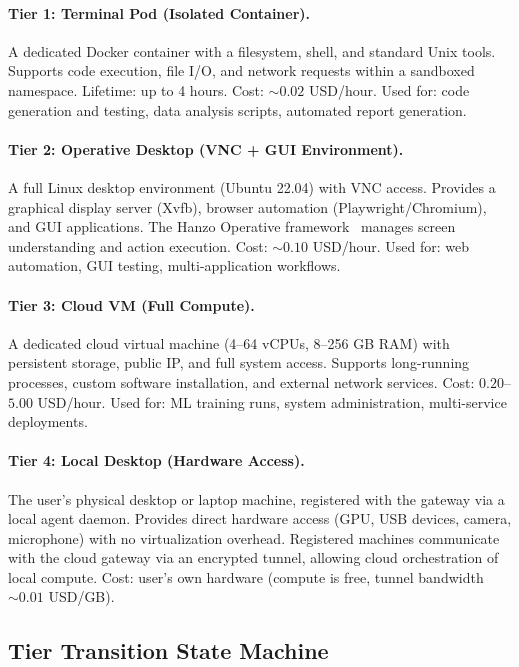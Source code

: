 \documentclass[11pt]{article}
\begin{document}
\paragraph{Tier 1: Terminal Pod (Isolated Container).}
A dedicated Docker container with a filesystem, shell, and standard
Unix tools. Supports code execution, file I/O, and network requests within
a sandboxed namespace. Lifetime: up to 4 hours. Cost: $\sim 0.02$ USD/hour.
Used for: code generation and testing, data analysis scripts, automated
report generation.

\paragraph{Tier 2: Operative Desktop (VNC + GUI Environment).}
A full Linux desktop environment (Ubuntu 22.04) with VNC access. Provides
a graphical display server (Xvfb), browser automation (Playwright/Chromium),
and GUI applications. The Hanzo Operative framework~\cite{hanzo2024operative}
manages screen understanding and action execution. Cost: $\sim 0.10$ USD/hour.
Used for: web automation, GUI testing, multi-application workflows.

\paragraph{Tier 3: Cloud VM (Full Compute).}
A dedicated cloud virtual machine (4--64 vCPUs, 8--256 GB RAM) with
persistent storage, public IP, and full system access. Supports long-running
processes, custom software installation, and external network services. Cost:
$0.20$--$5.00$ USD/hour. Used for: ML training runs, system administration,
multi-service deployments.

\paragraph{Tier 4: Local Desktop (Hardware Access).}
The user's physical desktop or laptop machine, registered with the gateway
via a local agent daemon. Provides direct hardware access (GPU, USB devices,
camera, microphone) with no virtualization overhead. Registered machines
communicate with the cloud gateway via an encrypted tunnel, allowing cloud
orchestration of local compute. Cost: user's own hardware (compute is free,
tunnel bandwidth $\sim 0.01$ USD/GB).

\subsection{Tier Transition State Machine}
\end{document}
